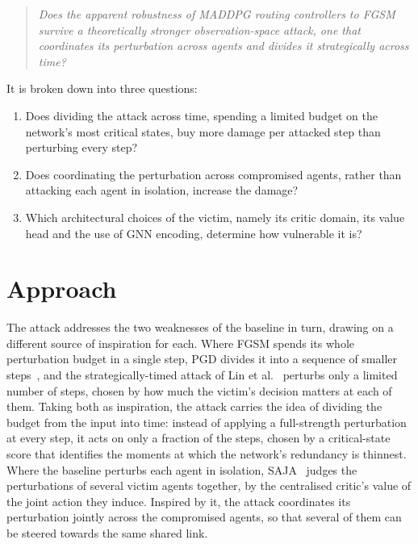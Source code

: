 \begin{quote}
\emph{Does the apparent robustness of MADDPG routing controllers to FGSM survive a
theoretically stronger observation-space attack, one that coordinates its perturbation
across agents and divides it strategically across time?}
\end{quote}

\noindent It is broken down into three questions:
\begin{enumerate}
  \item[\textbf{RQ1}] Does dividing the attack across time, spending a limited budget
        on the network's most critical states, buy more damage per attacked step than
        perturbing every step?
  \item[\textbf{RQ2}] Does coordinating the perturbation across compromised agents,
        rather than attacking each agent in isolation, increase the damage?
  \item[\textbf{RQ3}] Which architectural choices of the victim, namely its critic
        domain, its value head and the use of GNN encoding, determine how vulnerable
        it is?
\end{enumerate}

\section{Approach}
\label{sec:intro_approach}

The attack addresses the two weaknesses of the baseline in turn, drawing on a different
source of inspiration for each. Where FGSM spends its whole perturbation budget in a
single step, PGD divides it into a sequence of smaller
steps~\cite{madry2019deeplearningmodelsresistant}, and the strategically-timed attack of
Lin et al.~\cite{lin2019tacticsadversarialattackdeep} perturbs only a limited number of
steps, chosen by how much the victim's decision matters at each of them. Taking both as
inspiration, the attack carries the idea of dividing the budget from the input into
time: instead of applying a full-strength perturbation at every step, it acts on only a
fraction of the steps, chosen by a critical-state score that identifies the moments at
which the network's redundancy is thinnest. Where the
baseline perturbs each agent in isolation, SAJA~\cite{guo2025sajastateactionjointattack}
judges the perturbations of several victim agents together, by the centralised critic's
value of the joint action they induce. Inspired by it, the attack coordinates its
perturbation jointly across the compromised agents, so that several of them can be
steered towards the same shared link.

